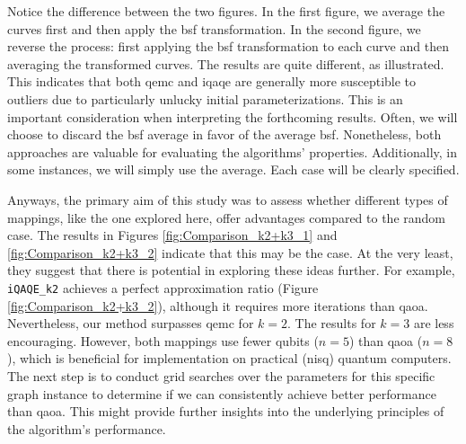 Notice the difference between the two figures. In the first figure, we average the curves first and then apply the \acrshort{bsf} transformation. In the second figure, we reverse the process: first applying the \acrshort{bsf} transformation to each curve and then averaging the transformed curves. The results are quite different, as illustrated. This indicates that both \acrshort{qemc} and \acrshort{iqaqe} are generally more susceptible to outliers due to particularly unlucky initial parameterizations. This is an important consideration when interpreting the forthcoming results. Often, we will choose to discard the \acrshort{bsf} average in favor of the average \acrshort{bsf}. Nonetheless, both approaches are valuable for evaluating the algorithms' properties. Additionally, in some instances, we will simply use the average. Each case will be clearly specified.

Anyways, the primary aim of this study was to assess whether different types of mappings, like the one explored here, offer advantages compared to the random case. The results in Figures \ref{fig:Comparison_k2+k3_1} and \ref{fig:Comparison_k2+k3_2} indicate that this may be the case. At the very least, they suggest that there is potential in exploring these ideas further. For example, \texttt{iQAQE\_k2} achieves a perfect approximation ratio (Figure \ref{fig:Comparison_k2+k3_2}), although it requires more iterations than \acrshort{qaoa}. Nevertheless, our method surpasses \acrshort{qemc} for $k = 2$. The results for $k = 3$ are less encouraging. However, both mappings use fewer qubits ($n = 5$) than \acrshort{qaoa} ($n = 8$), which is beneficial for implementation on practical (\acrshort{nisq}) quantum computers. The next step is to conduct grid searches over the parameters for this specific graph instance to determine if we can consistently achieve better performance than \acrshort{qaoa}. This might provide further insights into the underlying principles of the algorithm's performance.

